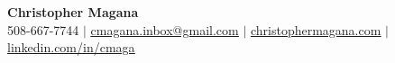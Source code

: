 \begin{center}
  \textbf{\Huge Christopher Magana} \\ \vspace{1pt}
  \small 508-667-7744 $|$
  \href{mailto:cmagana.inbox@gmail.com}{\underline{cmagana.inbox@gmail.com}} $|$
  \href{https://christophermagana.com}{\underline{christophermagana.com}} $|$
  \href{https://linkedin.com/in/cmaga}{\underline{linkedin.com/in/cmaga}}
\end{center}
